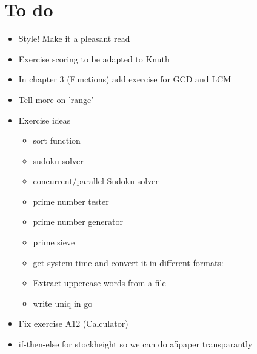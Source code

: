 \section{To do}

\begin{itemize}
\item
Style! Make it a pleasant read
\item
Exercise scoring to be adapted to Knuth
\item
In chapter 3 (Functions) add exercise for GCD and LCM
\item
Tell more on 'range'
\item
Exercise ideas
\begin{itemize}
\item
sort function
\item
sudoku solver
\item
concurrent/parallel Sudoku solver
\item
prime number tester
\item
prime number generator
\item
prime sieve
\item
get system time and convert it in different formats:
\item
Extract uppercase words from a file
\item
write uniq in go
\end{itemize}
\item
Fix exercise A12 (Calculator)
\item
if-then-else for stockheight so we can do a5paper transparantly
\end{itemize}
